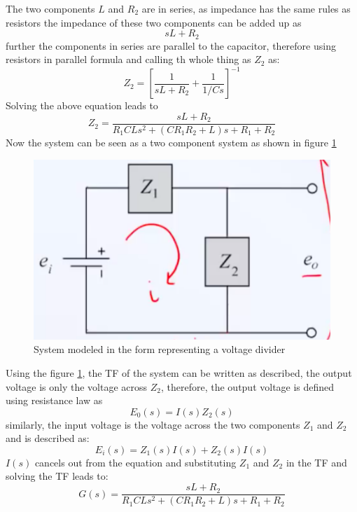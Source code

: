 The two components $L$ and $R_2$ are in series, as impedance has the same rules as resistors the impedance of these two components can be added up as $$ s L + R_2 $$ further the components in series are parallel to the capacitor, therefore using resistors in parallel formula and calling th whole thing as $Z_2$ as: $$ Z_2 = \left[ \frac{1}{sL + R_2} + \frac{1}{1/Cs} \right]^{-1} $$ Solving the above equation leads to $$ Z_2 = \frac{sL + R_2}{R_1 C L s^2 + (C R_1 R_2 + L)s + R_1 + R_2} $$ Now the system can be seen as a two component system as shown in figure \ref{Fig_Fund_ELK_Voltage_Div_2}
\begin{figure}[h!]
	\centering
	\includegraphics[width=0.75\linewidth]{Bilder/Fund_ELK_Voltage_DIv_2}
	\caption{System modeled in the form representing a voltage divider}
	\label{Fig_Fund_ELK_Voltage_Div_2}
\end{figure}

Using the figure \ref{Fig_Fund_ELK_Voltage_Div_2}, the TF of the system can be written as described, the output voltage is only the voltage across $Z_2$, therefore, the output voltage is defined using resistance law as $$E_{0}(s) = I(s) Z_{2}(s) $$ similarly, the input voltage is the voltage across the two components $Z_1$ and $Z_2$ and is described as: $$ E_{i}(s) = Z_{1}(s)I(s) +  Z_{2}(s)I(s) $$ $I(s)$ cancels out from the equation and substituting $Z_1$ and $Z_2$ in the TF and solving the TF leads to:
\begin{equation}
	G(s) = \frac{sL + R_2}{R_{1} C L s^2 + (C R_{1} R_{2} + L)s + R_1 + R_2}
\end{equation}
